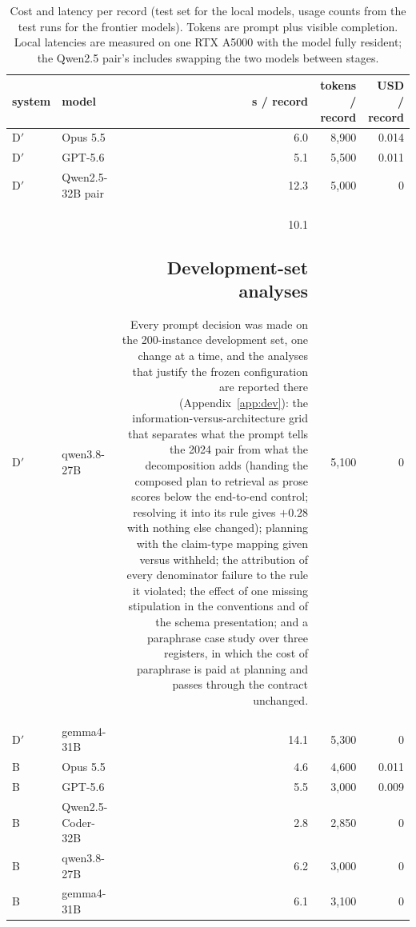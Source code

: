 \begin{table}[t]
\centering
\small
\setlength{\tabcolsep}{4pt}
\begin{tabular}{llrrr}
\toprule
system & model & s / record & tokens / record & USD / record \\
\midrule
D$'$ & Opus 5.5 & 6.0 & 8{,}900 & 0.014 \\
D$'$ & GPT-5.6 & 5.1 & 5{,}500 & 0.011 \\
D$'$ & Qwen2.5-32B pair & 12.3 & 5{,}000 & 0 \\
D$'$ & qwen3.8-27B & 10.1\subsection{Development-set analyses}
\label{sec:devpointer}

Every prompt decision was made on the 200-instance development set, one
change at a time, and the analyses that justify the frozen configuration are
reported there (Appendix~\ref{app:dev}): the information-versus-architecture
grid that separates what the prompt tells the 2024 pair from what the
decomposition adds (handing the composed plan to retrieval as prose scores
below the end-to-end control; resolving it into its rule gives $+0.28$ with
nothing else changed); planning with the claim-type mapping given versus
withheld; the attribution of every denominator failure to the rule it
violated; the effect of one missing stipulation in the conventions and of the
schema presentation; and a paraphrase case study over three registers, in
which the cost of paraphrase is paid at planning and passes through the
contract unchanged.

 & 5{,}100 & 0 \\
D$'$ & gemma4-31B & 14.1 & 5{,}300 & 0 \\
B & Opus 5.5 & 4.6 & 4{,}600 & 0.011 \\
B & GPT-5.6 & 5.5 & 3{,}000 & 0.009 \\
B & Qwen2.5-Coder-32B & 2.8 & 2{,}850 & 0 \\
B & qwen3.8-27B & 6.2 & 3{,}000 & 0 \\
B & gemma4-31B & 6.1 & 3{,}100 & 0 \\
\bottomrule
\end{tabular}
\caption{Cost and latency per record (test set for the local models, usage
counts from the test runs for the frontier models). Tokens are prompt plus
visible completion. Local latencies are measured on one RTX A5000 with the
model fully resident; the Qwen2.5 pair's includes swapping the two models
between stages.}
\label{tab:cost}
\end{table}


